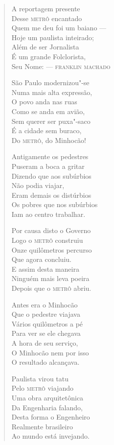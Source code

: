 \begin{verse}
A reportagem presente \\
Desse \textsc{metrô} encantado \\
Quem me deu foi um baiano --- \\
Hoje um paulista inteirado; \\
Além de ser Jornalista \\
É um grande Folclorista, \\
Seu Nome: ---  \textsc{franklin machado}

São Paulo modernizou"-se \\
Numa mais alta expressão, \\
O povo anda nas ruas \\
Como se anda em avião, \\
Sem querer ser puxa"-saco \\
É a cidade sem buraco, \\
Do \textsc{metrô}, do Minhocão! 

Antigamente os pedestres \\
Puseram a boca a gritar \\
Dizendo que aos subúrbios \\
Não podia viajar, \\
Eram demais os distúrbios \\
Os pobres que nos subúrbios \\
Iam ao centro trabalhar. 
\pagebreak

Por causa disto o Governo \\
Logo o \textsc{metrô} construiu \\
Onze quilômetros percurso \\
Que agora concluiu. \\
E assim desta maneira \\
Ninguém mais leva poeira \\
Depois que o \textsc{metrô} abriu. 

Antes era o Minhocão \\
Que o pedestre viajava \\
Vários quilômetros a pé \\
Para ver se ele chegava \\
A hora de seu serviço, \\
O Minhocão nem por isso \\
O resultado alcançava. 

Paulista virou tatu \\
Pelo \textsc{metrô} viajando \\
Uma obra arquitetônica \\
Da Engenharia falando, \\
Desta forma o Engenheiro \\
Realmente brasileiro \\
Ao mundo está invejando. 


\end{verse}
